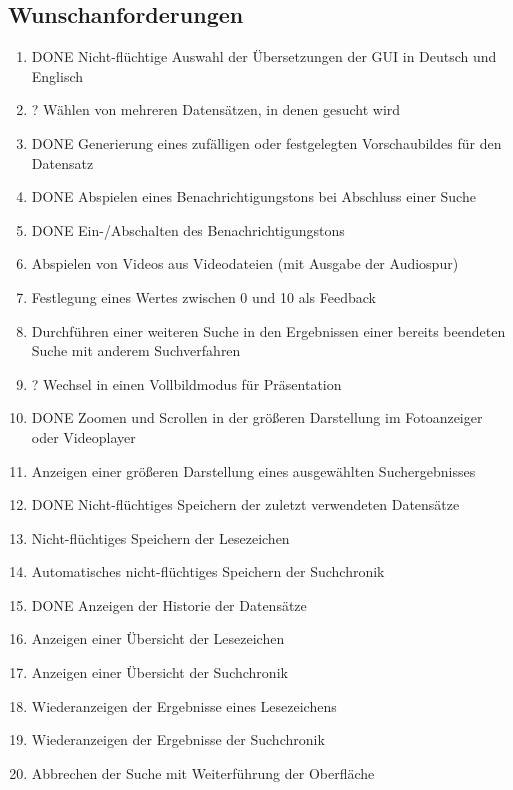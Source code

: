 \subsection{Wunschanforderungen}
\begin{enumerate} [label=\bfseries /FW \arabic*0/, leftmargin=*]
	\item DONE Nicht-flüchtige Auswahl der Übersetzungen der GUI in Deutsch und Englisch
	\newline
	\item ? Wählen von mehreren Datensätzen, in denen gesucht wird
	\item DONE Generierung eines zufälligen oder festgelegten Vorschaubildes für den Datensatz
	\newline
	\item DONE Abspielen eines Benachrichtigungstons bei Abschluss einer Suche
	\item DONE Ein-/Abschalten des Benachrichtigungstons
	\item Abspielen von Videos aus Videodateien (mit Ausgabe der Audiospur)
	\newline
	\item Festlegung eines Wertes zwischen 0 und 10 als Feedback
	\item Durchführen einer weiteren Suche in den Ergebnissen einer bereits beendeten Suche mit anderem Suchverfahren
	\newline
	\item ? Wechsel in einen Vollbildmodus für Präsentation
	\item DONE Zoomen und Scrollen in der größeren Darstellung im Fotoanzeiger oder Videoplayer \label{fw:zoom_scroll}
	\item Anzeigen einer größeren Darstellung eines ausgewählten Suchergebnisses
	\newline
	\item DONE Nicht-flüchtiges Speichern der zuletzt verwendeten Datensätze
	\item Nicht-flüchtiges Speichern der Lesezeichen
	\item Automatisches nicht-flüchtiges Speichern der Suchchronik
	\item DONE Anzeigen der Historie der Datensätze
	\item Anzeigen einer Übersicht der Lesezeichen
	\item Anzeigen einer Übersicht der Suchchronik
	\item Wiederanzeigen der Ergebnisse eines Lesezeichens
	\item Wiederanzeigen der Ergebnisse der Suchchronik
	\newline
	\item Abbrechen der Suche mit Weiterführung der Oberfläche
\end{enumerate}
\pagebreak

